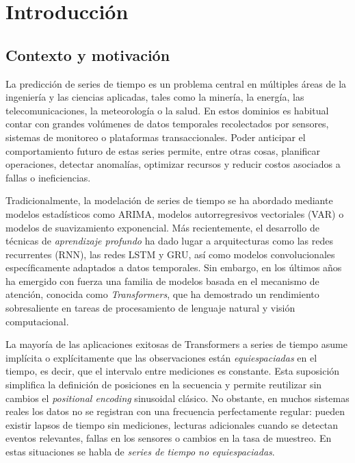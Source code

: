 \chapter{Introducción}
\label{cap:introduccion}

\section{Contexto y motivación}

La predicción de series de tiempo es un problema central en múltiples áreas de la ingeniería y las ciencias aplicadas, tales como la minería, la energía, las telecomunicaciones, la meteorología o la salud. En estos dominios es habitual contar con grandes volúmenes de datos temporales recolectados por sensores, sistemas de monitoreo o plataformas transaccionales. Poder anticipar el comportamiento futuro de estas series permite, entre otras cosas, planificar operaciones, detectar anomalías, optimizar recursos y reducir costos asociados a fallas o ineficiencias.

\hfill

Tradicionalmente, la modelación de series de tiempo se ha abordado mediante modelos estadísticos como ARIMA, modelos autorregresivos vectoriales (VAR) o modelos de suavizamiento exponencial. Más recientemente, el desarrollo de técnicas de \textit{aprendizaje profundo} ha dado lugar a arquitecturas como las redes recurrentes (RNN), las redes LSTM y GRU, así como modelos convolucionales específicamente adaptados a datos temporales. Sin embargo, en los últimos años ha emergido con fuerza una familia de modelos basada en el mecanismo de atención, conocida como \textit{Transformers}, que ha demostrado un rendimiento sobresaliente en tareas de procesamiento de lenguaje natural y visión computacional.

\hfill

La mayoría de las aplicaciones exitosas de Transformers a series de tiempo asume implícita o explícitamente que las observaciones están \textit{equiespaciadas} en el tiempo, es decir, que el intervalo entre mediciones es constante. Esta suposición simplifica la definición de posiciones en la secuencia y permite reutilizar sin cambios el \textit{positional encoding} sinusoidal clásico. No obstante, en muchos sistemas reales los datos no se registran con una frecuencia perfectamente regular: pueden existir lapsos de tiempo sin mediciones, lecturas adicionales cuando se detectan eventos relevantes, fallas en los sensores o cambios en la tasa de muestreo. En estas situaciones se habla de \textit{series de tiempo no equiespaciadas}.

